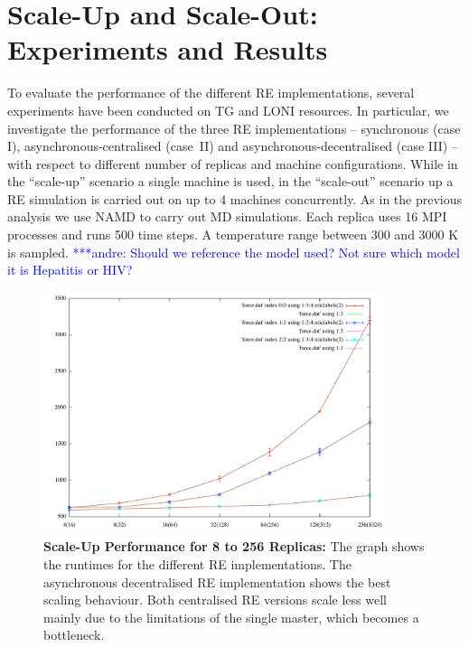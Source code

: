 \documentclass{rspublic}
\newcommand{\alnote}[1]{ {\textcolor{blue} { ***andre: #1 }}}
\newcommand{\alnote}[1]{}
\begin{document}
\section{Scale-Up and Scale-Out: Experiments and Results}
\label{sec:performance}

To evaluate the performance of the different RE implementations, several 
experiments have been conducted on TG and LONI resources. In particular, 
we investigate the performance of the three RE implementations -- synchronous (case I),
asynchronous-centralised (case~II) and asynchronous-decentralised (case III) -- with
respect to different number of replicas and machine configurations.
While in the ``scale-up'' scenario a single machine is used, in the ``scale-out''
scenario up a RE simulation is carried out on up to 4 machines concurrently.
As in the previous analysis we use NAMD to carry out MD simulations. Each
replica uses 16 MPI processes and runs 500 time steps. A temperature range 
between 300 and 3000 K is sampled.
\alnote{Should we reference the model used? Not sure which model it is
Hepatitis or HIV?}


%
\begin{figure}
\centering
\includegraphics[width=0.9\textwidth]{../data/scale_up_gnu.pdf}
\caption{\small \textbf{Scale-Up Performance for 8 to 256 Replicas:} 
  The graph shows the runtimes for the different RE implementations.
  The asynchronous decentralised RE implementation shows the best
  scaling behaviour. Both centralised RE versions scale less well mainly due
  to the limitations of the single master, which becomes a bottleneck.}
\label{fig:graph}
\vspace{-1em}
\end{figure}
\end{document}
